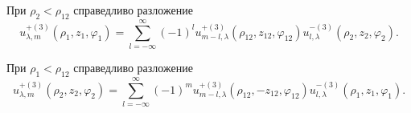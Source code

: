 \begin{theorem}
При ${\rho _2} < {\rho _{12}}$ справедливо разложение
\begin{equation}\label{eq:1:8}
u_{\lambda ,m}^{ + (3)}\left( {{\rho _1},{z_1},{\varphi _1}} \right) = \sum\limits_{l =  - \infty }^\infty  {{{( - 1)}^l}} u_{m - l,\lambda }^{ + (3)}\left( {{\rho _{12}},{z_{12}},{\varphi _{12}}} \right)u_{l,\lambda }^{ - (3)}\left( {{\rho _2},{z_2},{\varphi _2}} \right).
\end{equation}

При ${\rho _1} < {\rho _{12}}$ справедливо разложение
\begin{equation}\label{eq:1:9}
u_{\lambda ,m}^{ + (3)}\left( {{\rho _2},{z_2},{\varphi _2}} \right) = \sum\limits_{l =  - \infty }^\infty  {{{( - 1)}^m}} u_{m - l,\lambda }^{ + (3)}\left( {{\rho _{12}}, - {z_{12}},{\varphi _{12}}} \right)u_{l,\lambda }^{ - (3)}\left( {{\rho _1},{z_1},{\varphi _1}} \right).
\end{equation}
\end{theorem}
%
%
